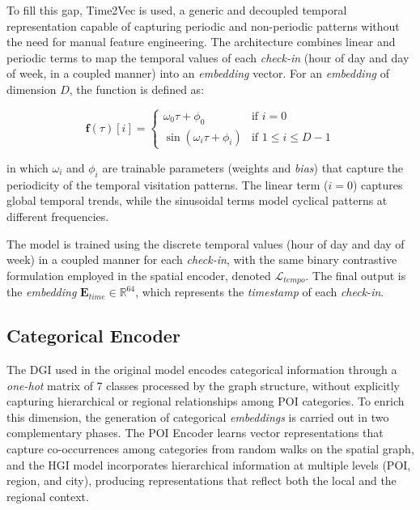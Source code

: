 To fill this gap, Time2Vec \cite{kazemi2019time2vec} is used, a generic and decoupled temporal representation capable of capturing periodic and non-periodic patterns without the need for manual feature engineering. The architecture combines linear and periodic terms to map the temporal values of each \textit{check-in} (hour of day and day of week, in a coupled manner) into an \textit{embedding} vector. For an \textit{embedding} of dimension $D$, the function is defined as:

\begin{equation}
\mathbf{f}(\tau)[i] = \begin{cases} \omega_0 \tau + \phi_0 & \text{if } i=0 \\ \sin(\omega_i \tau + \phi_i) & \text{if } 1 \leq i \leq D-1 \end{cases}
\label{eq:time2vec}
\end{equation}

in which $\omega_i$ and $\phi_i$ are trainable parameters (weights and \textit{bias}) that capture the periodicity of the temporal visitation patterns. The linear term ($i=0$) captures global temporal trends, while the sinusoidal terms model cyclical patterns at different frequencies.

The model is trained using the discrete temporal values (hour of day and day of week) in a coupled manner for each \textit{check-in}, with the same binary contrastive formulation employed in the spatial encoder, denoted $\mathcal{L}_{tempo}$. The final output is the \textit{embedding} $\mathbf{E}_{time} \in \mathbb{R}^{64}$, which represents the \textit{timestamp} of each \textit{check-in}.

\subsection{Categorical Encoder}

The DGI used in the original model encodes categorical information through a \textit{one-hot} matrix of 7 classes processed by the graph structure, without explicitly capturing hierarchical or regional relationships among POI categories. To enrich this dimension, the generation of categorical \textit{embeddings} is carried out in two complementary phases. The POI Encoder learns vector representations that capture co-occurrences among categories from random walks on the spatial graph, and the HGI model \cite{huang2023learning} incorporates hierarchical information at multiple levels (POI, region, and city), producing representations that reflect both the local and the regional context.

